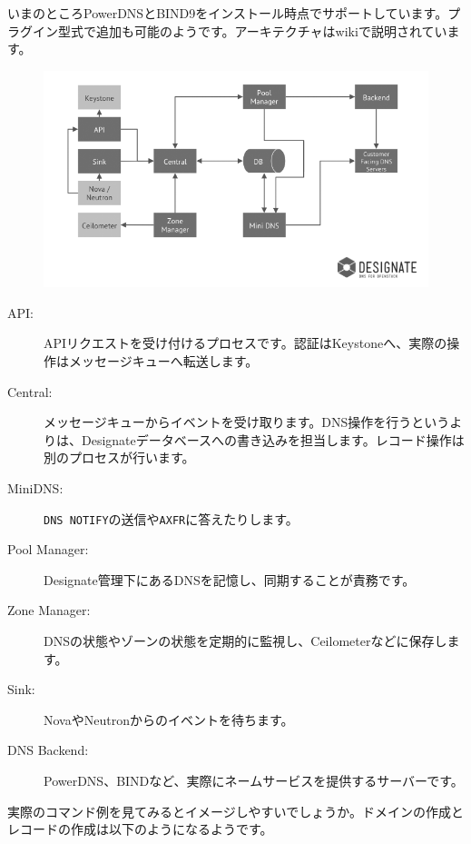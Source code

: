 いまのところPowerDNSとBIND9をインストール時点でサポートしています。プラグイン型式で追加も可能のようです。アーキテクチャはwikiで説明されています。

\begin{figure}[htb]
	\begin{center}
		\includegraphics[width=\textwidth]{img/Designate-Arch.png}
	\end{center}
\end{figure}

\begin{description}
	\item[API:] APIリクエストを受け付けるプロセスです。認証はKeystoneへ、実際の操作はメッセージキューへ転送します。
	\item[Central:] メッセージキューからイベントを受け取ります。DNS操作を行うというよりは、Designateデータベースへの書き込みを担当します。レコード操作は別のプロセスが行います。
	\item[MiniDNS:] \verb|DNS NOTIFY|の送信や\verb|AXFR|に答えたりします。
	\item[Pool Manager:] Designate管理下にあるDNSを記憶し、同期することが責務です。
	\item[Zone Manager:] DNSの状態やゾーンの状態を定期的に監視し、Ceilometerなどに保存します。
	\item[Sink:] NovaやNeutronからのイベントを待ちます。
	\item[DNS Backend:] PowerDNS、BINDなど、実際にネームサービスを提供するサーバーです。
\end{description}

実際のコマンド例を見てみるとイメージしやすいでしょうか。ドメインの作成とレコードの作成は以下のようになるようです。

